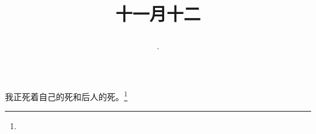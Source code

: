 \title{\date[d=12,m=12,y=2024][year:cn-y,年,month:cn,day:cn,日,·,weekday]·十一月十二 }
我正死着自己的死和后人的死。\footnote{ }

